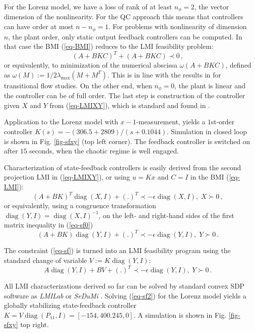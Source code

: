 \documentclass[12pt, a4paper,reqno]{amsart}
\theoremstyle{definition}
\newcounter{step}[algorithm]
\def\diag{\mathop{ \mbox{diag}}\limits}
\begin{document}
For the Lorenz model, we have a loss of rank of at least $n_\phi = 2$, the vector dimension of the nonlinearity. 
For the QC approach this means that controllers  can have order at most $n-n_\phi = 1$. For problems with nonlinearity of dimension $n$, the plant order, 
only static output feedback controllers can be computed. In that case the BMI (\ref{eq-BMI}) reduces to the LMI feasibility problem:
$$(A+BKC)^T + (A+BKC) \prec 0\,,$$
or equivalently, to minimization of the numerical abscissa $\omega(A+BKC)$, 
defined as $\omega(M):= 1/2{\lambda_{\max}}(M+M^T)$. 
This is in line  with the results in \cite{kalur2021nonlinear} for transitional flow studies. 
On the other end, when $n_\phi = 0$, the plant is linear and the controller can be of full order. 
The last step is
construction of the controller given $X$ and $Y$ from (\ref{eq-LMIXY}), which is standard and found in \cite{gahinet1994linear}. 

Application to  the Lorenz model with  $x-1$-measurement, 
yields a $1$st-order controller  $K(s) = -(306.5+2809)/(s+0.1044)$. 
Simulation in closed loop is shown in Fig. \ref{fig-sfxy} (top left corner). The feedback controller is switched on after $15$ seconds, when the chaotic regime is well engaged. 



Characterization of state-feedback controllers is easily derived from the second projection LMI in  (\ref{eq-LMIXY}), 
or using $u = K x$ and $C = I$  in the BMI (\ref{eq-LMI}): 
\begin{equation}
\label{eq-sf0}(A+BK)^T \diag(X,  I)  +(.)^T \prec -\epsilon \diag(X,  I),\; X \succ 0 \,,
\end{equation}
%
or equivalently, using a congruence transformation $\diag(Y,  I ) =  \diag(X,  I ) ^{-1}$, 
on the left- and right-hand sides of the first matrix inequality in (\ref{eq-sf0})
\begin{equation}
\label{eq-sf}(A+BK) \diag(Y,  I ) + (.)^T \prec -\epsilon \diag(Y,  I ),\; Y \succ 0\,.
\end{equation}
 
The
constraint (\ref{eq-sf}) is turned into an  LMI feasibility program using the standard change of variable $V:= K \diag(Y, I )$:
\begin{equation}
\label{eq-sf2}A \diag(Y, I )  + B V + (.)^T \prec -\epsilon \diag(Y,  I ),\; Y \succ 0 \,.
\end{equation}

All
LMI characterizations derived so far can be solved by standard convex SDP software as {\it LMILab}  \cite{MatlabRobust} or {\it SeDuMi}
\cite{sturm1999using}. Solving  (\ref{eq-sf2}) for the Lorenz model yields a globally stabilizing state-feedback controller $K = V \diag(P_{11}, I)= [-154,40   0.245, 0] $. A simulation is shown in Fig. \ref{fig-sfxy} top right. 
\end{document}
